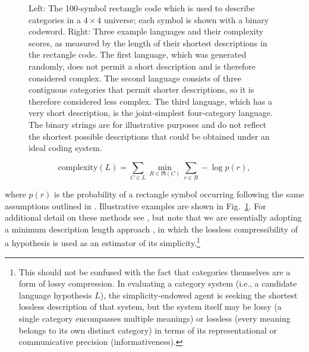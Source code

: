 \documentclass[doc,biblatex]{apa7}
\begin{document}
	\begin{figure}
	\vspace*{2pt}
	\caption{Left: The 100-symbol rectangle code which is used to describe categories in a $4 \times 4$ universe; each symbol is shown with a binary codeword. Right: Three example languages and their complexity scores, as measured by the length of their shortest descriptions in the rectangle code. The first language, which was generated randomly, does not permit a short description and is therefore considered complex. The second language consists of three contiguous categories that permit shorter descriptions, so it is therefore considered less complex. The third language, which has a very short description, is the joint-simplest four-category language. The binary strings are for illustrative purposes and do not reflect the shortest possible descriptions that could be obtained under an ideal coding system.}
	\label{fig02}
	\end{figure}

	\begin{equation}
	\mathrm{complexity}(L) = \sum_{C \in L} \min_{R\in\Re(C)} \sum_{r \in R} -\log p(r),
	\label{complexity}
	\end{equation}

\noindent where $p(r)$ is the probability of a rectangle symbol occurring following the same assumptions outlined in \textcite[p.~38--39]{Fass:2002}. Illustrative examples are shown in Fig.~\ref{fig02}. For additional detail on these methods see \textcite[p.~91--97]{Carr:2019}, but note that we are essentially adopting a minimum description length approach \parencite{Rissanen:1978,Grunwald:2007}, in which the lossless compressibility of a hypothesis is used as an estimator of its simplicity.\footnote{This should not be confused with the fact that categories themselves are a form of lossy compression. In evaluating a category system (i.e., a candidate language hypothesis $L$), the simplicity-endowed agent is seeking the shortest lossless description of that system, but the system itself may be lossy (a single category encompasses multiple meanings) or lossless (every meaning belongs to its own distinct category) in terms of its representational or communicative precision (informativeness).}
\end{document}

